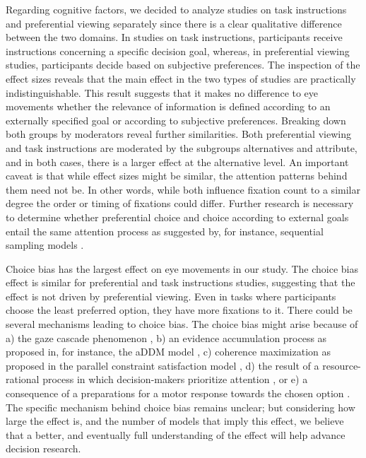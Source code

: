 \documentclass[english,natbib,man,floatsintext]{apa6}
\begin{document}
Regarding cognitive factors, we decided to analyze studies on task instructions and preferential viewing separately since there is a clear qualitative difference between the two domains. In studies on task instructions, participants receive instructions concerning a specific decision goal, whereas, in preferential viewing studies, participants decide based on subjective preferences. The inspection of the effect sizes reveals that the main effect in the two types of studies are practically indistinguishable. This result suggests that it makes no difference to eye movements whether the relevance of information is defined according to an externally specified goal or according to subjective preferences. Breaking down both groups by moderators reveal further similarities. Both preferential viewing and task instructions are moderated by the subgroups alternatives and attribute, and in both cases, there is a larger effect at the alternative level. An important caveat is that while effect sizes might be similar, the attention patterns behind them need not be. In other words, while both influence fixation count to a similar degree the order or timing of fixations could differ. Further research is necessary to determine whether preferential choice and choice according to external goals entail the same attention process as suggested by, for instance, sequential sampling models \citep{forstmann2016}.    

Choice bias has the largest effect on eye movements in our study. The choice bias effect is similar for preferential and task instructions studies, suggesting that the effect is not driven by preferential viewing. Even in tasks where participants choose the least preferred option, they have more fixations to it. There could be several mechanisms leading to choice bias. The choice bias might arise because of a) the gaze cascade phenomenon \citep{shimojo2003a}, b) an evidence accumulation process as proposed in, for instance, the aDDM model \citep{krajbich2010a}, c) coherence maximization as proposed in the parallel constraint satisfaction model \citep{gloeckner2011a}, d) the result of a resource-rational process in which decision-makers prioritize attention \citep{callaway2019a}, or e) a consequence of a preparations for a motor response towards the chosen option \citep{hayhoe2014a}. The specific mechanism behind choice bias remains unclear; but considering how large the effect is, and the number of models that imply this effect, we believe that a better, and eventually full understanding of the effect will help advance decision research. 
\end{document}
